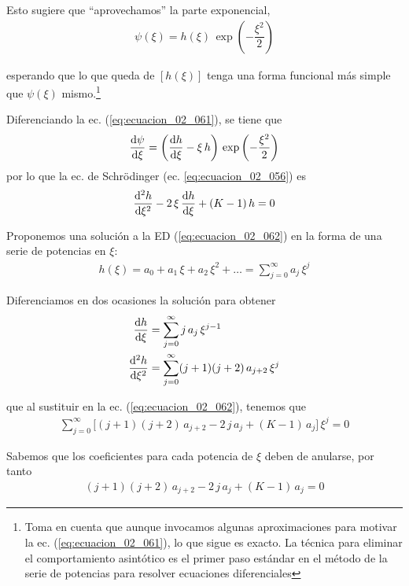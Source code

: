 Esto sugiere que \enquote{aprovechamos} la parte exponencial,
\begin{align}
\psi (\xi) = h (\xi) \, \exp \left( - \dfrac{\xi^{2}}{2} \right)
\label{eq:ecuacion_02_061}
\end{align}

esperando que lo que queda de $[h (\xi)]$ tenga una forma funcional más simple que $\psi (\xi)$ mismo.\footnote{Toma en cuenta que aunque invocamos algunas aproximaciones para motivar la ec. (\ref{eq:ecuacion_02_061}), lo que sigue es exacto. La técnica para eliminar el comportamiento asintótico es el primer paso estándar en el método de la serie de potencias para resolver ecuaciones diferenciales}
\par
Diferenciando la ec. (\ref{eq:ecuacion_02_061}), se tiene que
\begin{align*}
\dv{\psi}{\xi} = \left( \dv{h}{\xi} - \xi \, h \right) \, \exp \left( - \dfrac{\xi^{2}}{2} \right)
\end{align*}
por lo que la ec. de Schrödinger (ec. \ref{eq:ecuacion_02_056}) es
\begin{align}
\dv[2]{h}{\xi} - 2 \, \xi \, \dv{h}{\xi} +  (K - 1) \, h = 0
\label{eq:ecuacion_02_062}
\end{align}

Proponemos una solución a la ED (\ref{eq:ecuacion_02_062}) en la forma de una serie de potencias en $\xi$:
\begin{align}
h (\xi) = a_{0} + a_{1} \, \xi + a_{2} \, \xi^{2} + \ldots = \sum_{j=0}^{\infty} a_{j} \, \xi^{j}
\label{eq:ecuacion_02_063}
\end{align}

Diferenciamos en dos ocasiones la solución para obtener
\begin{align*}
\dv{h}{\xi} &= \sum_{j=0}^{\infty} j \, a_{j} \, \xi^{j-1} \\
\dv[2]{h}{\xi} &= \sum_{j=0}^{\infty} (j + 1)(j + 2) \, a_{j+2} \, \xi^{j}
\end{align*}

que al sustituir en la ec. (\ref{eq:ecuacion_02_062}), tenemos que
\begin{align}
\sum_{j=0}^{\infty} \bigg[ (j + 1)(j + 2) \, a_{j+2} - 2 \, j \, a_{j} +  (K - 1) \, a_{j} \bigg] \, \xi^{j} = 0
\label{eq:ecuacion_02_64}
\end{align}

Sabemos que los coeficientes para cada potencia de $\xi$ deben de anularse, por tanto
\begin{align*}
(j + 1)(j + 2) \, a_{j+2} - 2 \, j \, a_{j} +  (K - 1) \, a_{j} = 0
\end{align*}

